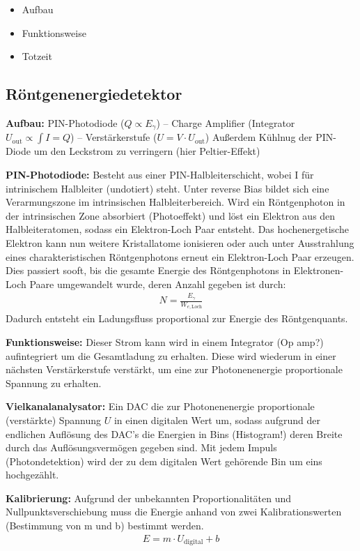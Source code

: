 \documentclass[10pt, a4paper]{article}
\begin{document}
\begin{itemize}
  \item Aufbau
  \item Funktionsweise
  \item Totzeit
\end{itemize}

\subsection{Röntgenenergiedetektor}
\textbf{Aufbau:} PIN-Photodiode ($Q \propto E_\gamma$) -- Charge Amplifier (Integrator $U_\mathrm{out} \propto \int I = Q$) -- Verstärkerstufe ($U = V \cdot U_\mathrm{out}$)
Außerdem Kühlnug der PIN-Diode um den Leckstrom zu verringern (hier Peltier-Effekt)

\textbf{PIN-Photodiode:} Besteht aus einer PIN-Halbleiterschicht, wobei I für intrinischem Halbleiter (undotiert) steht.
Unter reverse Bias bildet sich eine Verarmungszone im intrinsischen Halbleiterbereich.
Wird ein Röntgenphoton in der intrinsischen Zone absorbiert (Photoeffekt) und löst ein Elektron aus den Halbleiteratomen, sodass ein Elektron-Loch Paar entsteht.
Das hochenergetische Elektron kann nun weitere Kristallatome ionisieren oder auch unter Ausstrahlung eines charakteristischen Röntgenphotons erneut ein Elektron-Loch Paar erzeugen.
Dies passiert sooft, bis die gesamte Energie des Röntgenphotons in Elektronen-Loch Paare umgewandelt wurde, deren Anzahl gegeben ist durch:
\begin{align}
  N = \frac{E_\gamma}{W_{e,\mathrm{Loch}}}
\end{align}
Dadurch entsteht ein Ladungsfluss proportional zur Energie des Röntgenquants.

\textbf{Funktionsweise:} Dieser Strom kann wird in einem Integrator (Op amp?) aufintegriert um die Gesamtladung zu erhalten.
Diese wird wiederum in einer nächsten Verstärkerstufe verstärkt, um eine zur Photonenenergie proportionale Spannung zu erhalten.

\textbf{Vielkanalanalysator:} Ein DAC die zur Photonenenergie proportionale (verstärkte) Spannung $U$ in einen digitalen Wert um, sodass aufgrund der endlichen Auflösung des DAC's die Energien in Bins (Histogram!) deren Breite durch das Auflösungsvermögen gegeben sind.
Mit jedem Impuls (Photondetektion) wird der zu dem digitalen Wert gehörende Bin um eins hochgezählt.

\textbf{Kalibrierung:} Aufgrund der unbekannten Proportionalitäten und Nullpunktsverschiebung muss die Energie anhand von zwei Kalibrationswerten
(Bestimmung von m und b) bestimmt werden.
\begin{align}
  E = m \cdot U_\mathrm{digital} + b
  \label{eq:kalibrierung}
\end{align}
\end{document}
